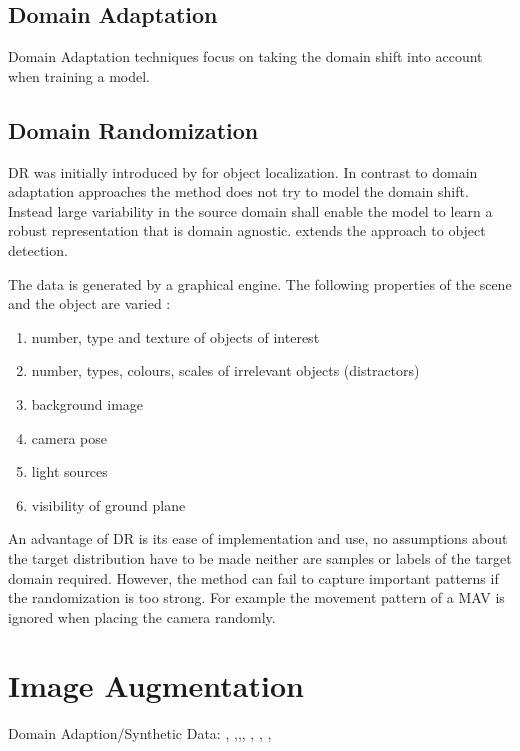 \subsection{Domain Adaptation}

Domain Adaptation techniques focus on taking the domain shift into account when training a model.

\subsection{Domain Randomization}

\ac{DR} was initially introduced by \cite{Tobin2017} for object localization. In contrast to domain adaptation approaches the method does not try to model the domain shift. Instead large variability in the source domain shall enable the model to learn a robust representation that is domain agnostic. \cite{Tremblay2018a} extends the approach to object detection.

The data is generated by a graphical engine. The following properties of the scene and the object are varied \cite{Tremblay2018a}:

\begin{enumerate}
	\item number, type and texture of objects of interest
	\item number, types, colours, scales of irrelevant objects (distractors)
	\item background image
	\item camera pose
	\item light sources
	\item visibility of ground plane
\end{enumerate}

An advantage of \ac{DR} is its ease of implementation and use, no assumptions about the target distribution have to be made neither are samples or labels of the target domain required. However, the method can fail to capture important patterns if the randomization is too strong. For example the movement pattern of a \ac{MAV} is ignored when placing the camera randomly.


\section{Image Augmentation}


Domain Adaption/Synthetic Data:
 \cite{Chen2018c}, \cite{Xu2017}
,\cite{Inoue},\cite{Peng},
\cite{Rozantsev},  \cite{Le}, \cite{Liu2017}, \cite{Peng2017}

